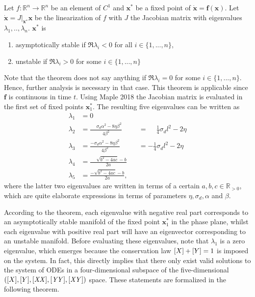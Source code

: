 \begin{theorem}[Lyapunov]
	Let $f: \mathbb{R}^n \to \mathbb{R}^n$ be an element of $C^1$ and $\bm{x}^*$ be a fixed point of $\bm{\dot{x}} = \bm{f}(\bm{x})$. Let $\bm{\dot{x}} = J\rvert_{ \bm{x}^* }  \bm{x}$ be the linearization of $f$ with $J$ the Jacobian matrix with eigenvalues $\lambda_1,..,\lambda_n$. $\bm{x}^*$ is
	\begin{enumerate}
		\item asymptotically stable if $\Re \lambda_i < 0$ for all $i \in \{1,...,n\}$,
		\item unstable if $\Re \lambda_i > 0$ for some $i \in \{1,...,n\}$
	\end{enumerate}
\end{theorem}
Note that the theorem does not say anything if $\Re \lambda_i = 0$ for some $i \in \{1,...,n\}$. Hence, further analysis is necessary in that case. This theorem is applicable since $\bm{f}$ is continuous in time $t$. Using Maple 2018 the Jacobian matrix is evaluated in the first set of fixed points $\bm{x}^*_1$. The resulting five eigenvalues can be written as
\begin{subequations}
	\label{eq:eigenvalues}
	\begin{alignat}{3}
	\lambda_1 &= 0& \\
	\lambda_2 &= 
	\frac{\phantom{-} \sigma_d \alpha^2 - 8\eta \beta^2}{4\beta^2} 
	&& = \phantom{-} \frac{1}{4}\sigma_d l^2 -2\eta\\  %
	\lambda_3 &= 
	\frac{- \sigma_d \alpha^2 - 8\eta \beta^2}{4\beta^2} 
	&& = -\frac{1}{4}\sigma_d l^2 -2\eta\\
	\lambda_4 &= \frac{\phantom{-}\sqrt{b^2-4ac}-b}{2a} & \\
	\lambda_5 &= \frac{-\sqrt{b^2-4ac}-b}{2a},  &
	\end{alignat}
\end{subequations}
where the latter two eigenvalues are written in terms of a certain $a, b, c \in \mathbb{R}_{>0}$, which are quite elaborate expressions in terms of parameters $\eta, \sigma_d, \alpha$ and $\beta$.  

According to the theorem, each eigenvalue with negative real part corresponds to an asymptotically stable manifold of the fixed point $\bm{x}^*_1$ in the phase plane, whilst each eigenvalue with positive real part will have an eigenvector corresponding to an unstable manifold. Before evaluating these eigenvalues, note that $\lambda_1$ is a zero eigenvalue, which emerges because the conservation law $[X]+[Y]=1$ is imposed on the system. In fact, this directly implies that there only exist valid solutions to the system of ODEs in a four-dimensional subspace of the five-dimensional $\left( [X], [Y], \mathit{[XX]}, \mathit{[YY]}, \mathit{[XY]} \right)$ space. These statements are formalized in the following theorem. 

